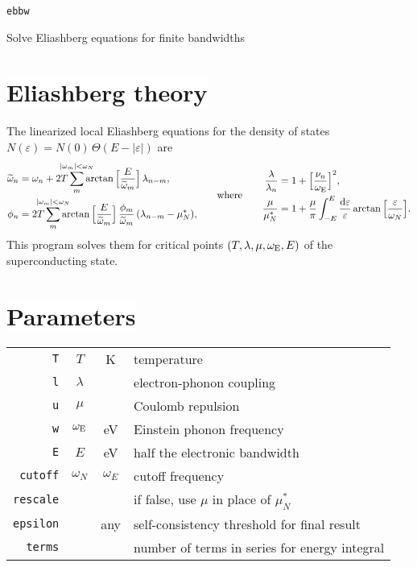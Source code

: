 \documentclass[a4paper]{article}
\def\D{\mathrm d}
\def\sub#1{\sb{\mathrm{#1}}}
\def\limit#1{\sp{\mathclap{#1}}}
\let\tilde\widetilde
\let\epsilon\varepsilon
\let\Theta\varTheta
\def\headline#1{\section*{\normalsize\normalfont%
   \rlap{\rule[0.5ex]{\textwidth}{0.4pt}}\qquad\colorbox{white}{#1}}}
\begin{document}
   \begin{center}
      \LARGE \texttt{ebbw} \par \bigskip
      \large Solve Eliashberg equations for finite bandwidths
   \end{center}

   \headline{Eliashberg theory}

   The linearized local Eliashberg equations for the density of states
   $N(\epsilon) = N(0) \, \Theta(E - |\epsilon|)$ are
   \begin{align*}
      \begin{aligned}
         \tilde \omega_n &= \omega_n + 2 T \sum_m \limit{|\omega_m| < \omega_N}
         \arctan \Big[ \frac E {\tilde \omega_m} \Big] \, \lambda_{n - m},
         \\
         \phi_n &= 2 T \sum_m \limit{|\omega_m| < \omega_N}
         \arctan \Big[ \frac E {\tilde \omega_m} \Big] \,
         \frac{\phi_m}{\tilde \omega_m} \, (\lambda_{n - m} - \mu^*_N),
      \end{aligned}
      \qquad \text{where} \qquad
      \begin{aligned}
         \frac \lambda {\lambda_n} &=
         1 + \Big[ \frac{\nu_n}{\omega \sub E} \Big]^2,
         \\
         \frac \mu {\mu^*_N} &=
         1 + \frac \mu \pi \int_{-E}^E \frac {\D \epsilon} \epsilon
         \arctan \Big[ \frac \epsilon {\omega_N} \Big].
      \end{aligned}
   \end{align*}
   This program solves them for critical points
   $( T, \lambda, \mu, \omega \sub E, E )$ of the superconducting state.

   \headline{Parameters}

   \begin{center}
      \begin{tabular}{r c c l}
         \verb|T| & $T$ & K & temperature \\
         \verb|l| & $\lambda$ & & electron-phonon coupling \\
         \verb|u| & $\mu$ & & Coulomb repulsion \\
         \verb|w| & $\omega \sub E$ & eV & Einstein phonon frequency \\
         \verb|E| & $E$ & eV & half the electronic bandwidth \\
         [2mm]
         \verb|cutoff| & $\omega_N$ & $\omega_E$ & cutoff frequency \\
         \verb|rescale| & & & if false, use $\mu$ in place of $\mu^*_N$ \\
         \verb|epsilon| & & any & self-consistency threshold for final result \\
         \verb|terms| & & & number of terms in series for energy integral
      \end{tabular}
   \end{center}
\end{document}
